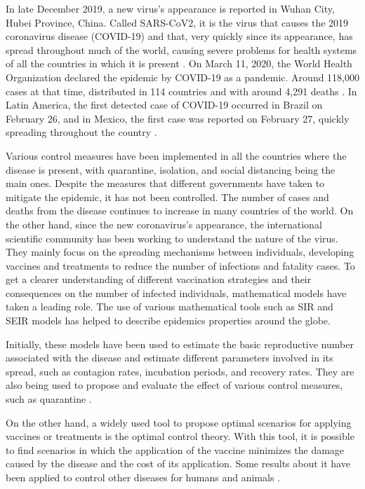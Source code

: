 In late December 2019, a new virus's appearance is reported in Wuhan City, Hubei Province, China. Called SARS-CoV2, it is the virus that causes the 2019 coronavirus disease (COVID-19) and that, very quickly since its appearance, has spread throughout much of the world, causing severe problems for health systems of all the countries in which it is present \cite{Who12020}. On March 11, 2020, the World Health Organization declared the epidemic by COVID-19 as a pandemic.  Around 118,000 cases at that time, distributed in 114 countries and with around 4,291 deaths \cite{Who512020}. In Latin America, the first
detected case of COVID-19 occurred in Brazil on February 26, and in Mexico, the first case was reported on February 27, quickly spreading throughout the country \cite{Ajrm2020,Acuna2020}.

Various control measures have been implemented in all the countries where the disease is present, with quarantine, isolation, and social distancing being the main ones. Despite the measures that different governments have taken to mitigate the epidemic, it has not been controlled. The number of cases and deaths from the disease continues to increase in many countries of the world. On the other hand, since the new coronavirus's appearance, the international scientific community has been working to understand the nature of the virus. They mainly focus on the spreading mechanisms between individuals, developing vaccines and treatments to reduce the number of infections and fatality cases. To get a clearer understanding of different vaccination strategies and their consequences on the number of infected individuals, mathematical models have taken a leading role. The use of various mathematical tools such as SIR and SEIR models has helped to describe epidemics properties around the globe.

Initially, these models have been used to estimate the basic reproductive number associated with the disease and estimate different parameters involved in its spread, such as contagion rates, incubation periods, and recovery rates. They are also being used to propose and evaluate the effect of various control measures, such as quarantine \cite{Acuna2020,Wang2020,Marimuthu2020,Liu2020,Ghosh2020,Calvetti2020,Shaikh2020}.

On the other hand, a widely used tool to propose optimal scenarios for applying vaccines or treatments is the optimal control theory. With this tool, it is possible to find scenarios in which the application of the vaccine minimizes the damage caused by the disease and the cost of its application. Some results about it have been applied to control other diseases for humans and animals \cite{Asano2008,Rodrigues2014,Tchuenche2011,Malik2016,Jaberi2014}.

